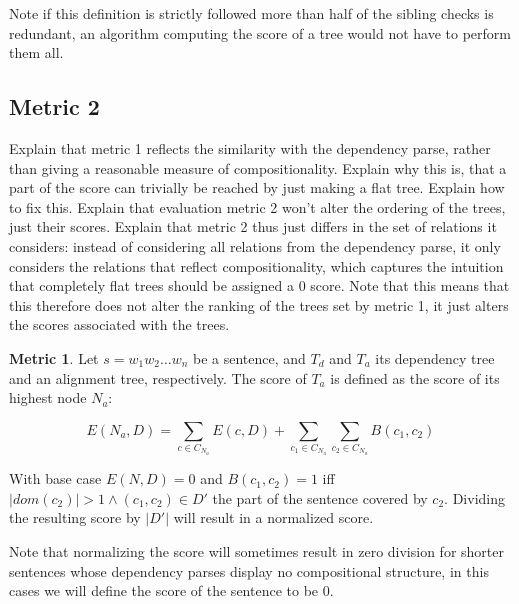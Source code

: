 \documentclass{report}
\theoremstyle{definition}
\newtheorem{metric}{Metric}
\theoremstyle{plain}
\begin{document}
\noindent  Note if this definition is strictly followed more than half of the sibling checks is redundant, an algorithm computing the score of a tree would not have to perform them all.

\subsection{Metric 2}

Explain that metric 1 reflects the similarity with the dependency parse, rather than giving a reasonable measure of compositionality. Explain why this is, that a part of the score can trivially be reached by just making a flat tree. Explain how to fix this. Explain that evaluation metric 2 won't alter the ordering of the trees, just their scores.
Explain that metric 2 thus just differs in the set of relations it considers: instead of considering all relations from the dependency parse, it only considers the relations that reflect compositionality, which captures the intuition that completely flat trees should be assigned a 0 score. Note that this means that this therefore does not alter the ranking of the trees set by metric 1, it just alters the scores associated with the trees.

\begin{metric}\label{m2}
Let $s = w_1 w_2 \dots w_n$ be a sentence, and $T_d$ and $T_a$ its dependency tree and an alignment tree, respectively. The score of $T_a$ is defined as the score of its highest node $N_{a}$:

$$
E(N_a,D) = \sum_{c\in C_{N_a}} E(c,D)+ \sum_{c_1\in C_{N_a}} \sum_{c_2\in C_{N_a}} B(c_1,c_2)
$$

\noindent With base case $E(N,D) = 0$ and $B(c_1,c_2) = 1$ iff  $|dom(c_2)| > 1 \land (c_1,c_2)\in D'$ the part of the sentence covered by $c_2$. Dividing the resulting score by $|D'|$ will result in a normalized score.
\end{metric}

Note that normalizing the score will sometimes result in zero division for shorter sentences whose dependency parses display no compositional structure, in this cases we will define the score of the sentence to be 0.

\end{document}
